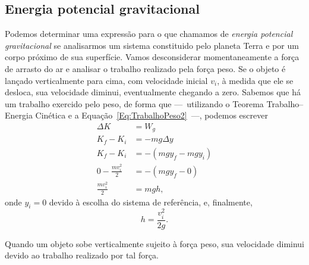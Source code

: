 \subsection{Energia potencial gravitacional}

Podemos determinar uma expressão para o que chamamos de \emph{energia potencial gravitacional} se analisarmos um sistema constituido pelo planeta Terra e por um corpo próximo de sua superfície. Vamos desconsiderar momentaneamente a força de arrasto do ar e analisar o trabalho realizado pela força peso. Se o objeto é lançado verticalmente para cima, com velocidade inicial $v_i$, à medida que ele se desloca, sua velocidade diminui, eventualmente chegando a zero. Sabemos que há um trabalho exercido pelo peso, de forma que ---~utilizando o Teorema Trabalho--Energia Cinética e a Equação~\ref{Eq:TrabalhoPeso2}~---, podemos escrever
\begin{align}
  \Delta K &= W_g \\
  K_f - K_i &=  -mg\Delta y \\
  K_f - K_i &=  -(mgy_f - mgy_i) \\
  0 - \frac{mv_i^2}{2} &= -(mgy_f - 0) \\
  \frac{mv_i^2}{2} &= mgh,
\end{align}
%
onde $y_i = 0$ devido à escolha do sistema de referência, e, finalmente,
\begin{equation}
    h = \frac{v_i^2}{2g}.
\end{equation}

\begin{marginfigure}[-2cm]
\centering
{}
\caption{Quando um objeto sobe verticalmente sujeito à força peso, sua velocidade diminui devido ao trabalho realizado por tal força.}
\end{marginfigure}

